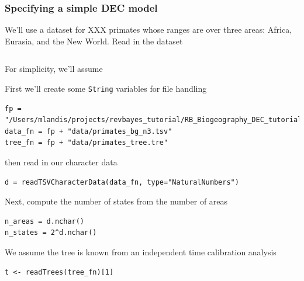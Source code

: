 \newpage


\subsubsection{Specifying a simple DEC model}

We'll use a dataset for XXX primates whose ranges are over three areas: Africa, Eurasia, and the New World.
Read in the dataset



\begin{snugshade}
\begin{lstlisting}

\end{lstlisting}
\end{snugshade}


For simplicity, we'll assume

First we'll create some {\tt String} variables for file handling

\begin{snugshade}
\begin{lstlisting}
fp = "/Users/mlandis/projects/revbayes_tutorial/RB_Biogeography_DEC_tutorial/"
data_fn = fp + "data/primates_bg_n3.tsv"
tree_fn = fp + "data/primates_tree.tre"
\end{lstlisting}
\end{snugshade}

then read in our character data

\begin{snugshade}
\begin{lstlisting}
d = readTSVCharacterData(data_fn, type="NaturalNumbers")
\end{lstlisting}
\end{snugshade}

Next, compute the number of states from the number of areas

\begin{snugshade}
\begin{lstlisting}
n_areas = d.nchar()
n_states = 2^d.nchar()
\end{lstlisting}
\end{snugshade}

We assume the tree is known from an independent time calibration analysis

\begin{snugshade}
\begin{lstlisting}
t <- readTrees(tree_fn)[1]
\end{lstlisting}
\end{snugshade}


